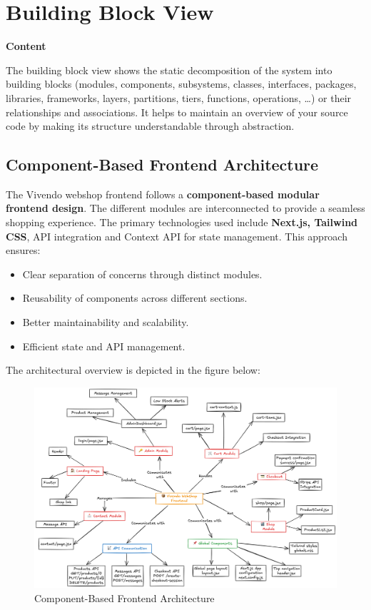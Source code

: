 \hypertarget{section-building-block-view}{%
\section{Building Block View}\label{section-building-block-view}}

\textbf{Content}

The building block view shows the static decomposition of the system into building blocks (modules, components, subsystems, classes, interfaces, packages, libraries, frameworks, layers, partitions, tiers, functions, operations, \ldots) or their relationships and associations. It helps to maintain an overview of your source code by making its structure understandable through abstraction.

\subsection{Component-Based Frontend Architecture}
The Vivendo webshop frontend follows a \textbf{component-based modular frontend design}. The different modules are interconnected to provide a seamless shopping experience. The primary technologies used include \textbf{Next.js, Tailwind CSS}, API integration and Context API for state management. This approach ensures:
\begin{itemize}
    \item Clear separation of concerns through distinct modules.
    \item Reusability of components across different sections.
    \item Better maintainability and scalability.
    \item Efficient state and API management.
\end{itemize}
The architectural overview is depicted in the figure below:

\begin{figure}[h]
    \centering
    \includegraphics[width=\textwidth]{images/New_frontend_architecture.png}
    \caption{Component-Based Frontend Architecture}
    \label{fig:architecture}
\end{figure}

